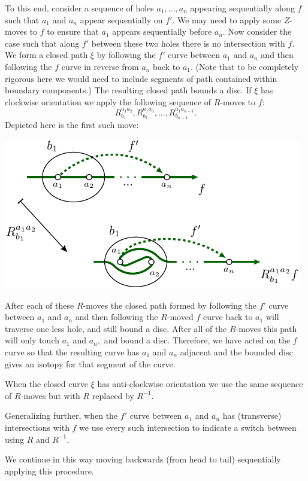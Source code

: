 \documentclass[aps, prl, letterpaper, twocolumn, superscriptaddress, notitlepage, 10pt]{revtex4-1}
\begin{document}
To this end, consider a sequence of holes $a_1,...,a_n$
appearing sequentially along $f$
such that $a_1$ and $a_n$ appear sequentially on $f'.$
We may need to apply some $Z$-moves to $f$ to ensure
that $a_1$ appears sequentially before $a_n$.
Now consider the case such that
along $f'$ between these two holes there is
no intersection with $f.$
We form a closed path $\xi$ by
following the $f'$ curve between $a_1$ and $a_n$ and then
following the $f$ curve in reverse from $a_n$ back to $a_1.$
(Note that to be completely rigorous here we would need to include segments
of path contained within boundary components.)
The resulting closed path bounds a disc.
If $\xi$ has clockwise orientation %
we apply the following sequence of $R$-moves to $f$:
$$
    R^{a_1a_2}_{b_1}, R^{a_1a_3}_{b_2}, ..., R^{a_1a_{n-1}}_{b_{n-1}}.
$$
Depicted here is the first such move:
\begin{center}
\includegraphics[]{pic-theorem.pdf}
\end{center}
After each of these $R$-moves the closed path
formed by 
following the $f'$ curve between $a_1$ and $a_n$ and then
following the $R$-moved $f$ curve back to $a_1$ will
traverse one less hole, and still bound a disc.
After all of the $R$-moves this path will only
touch $a_1$ and $a_n,$ and bound a disc.
Therefore, we have acted on the $f$ curve so that
the resulting curve has $a_1$ and $a_n$ adjacent
and the bounded disc gives an isotopy for that
segment of the curve.

When the closed curve $\xi$ has anti-clockwise orientation
we use the same sequence of $R$-moves but with $R$ replaced by $R^{-1}.$

Generalizing further,
when the $f'$ curve between $a_1$ and $a_n$ has (transverse) intersections
with $f$ we use every such intersection to indicate a switch
between using $R$ and $R^{-1}.$

We continue in this way moving backwards (from
head to tail) sequentially applying this procedure.
\end{document}
